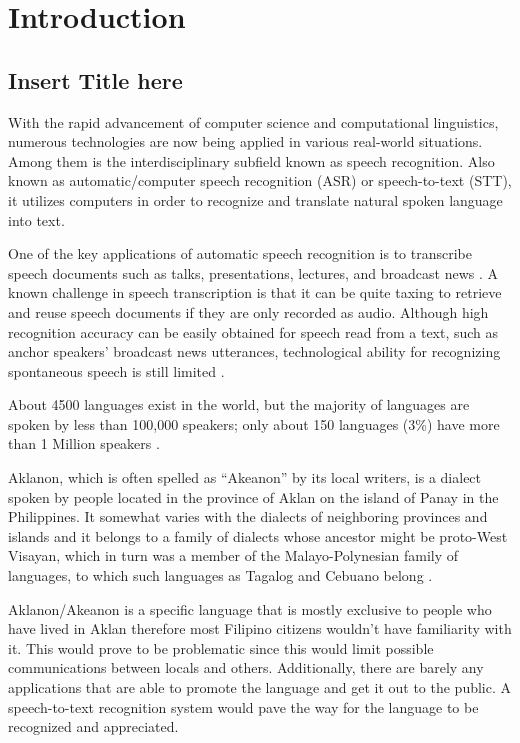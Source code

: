 \chapter{Introduction}

\section{Insert Title here}

With the rapid advancement of computer science and computational linguistics, numerous technologies are now being applied in various real-world situations. Among them is the interdisciplinary subfield known as speech recognition. Also known as automatic/computer speech recognition (ASR) or speech-to-text (STT), it utilizes computers in order to recognize and translate natural spoken language into text.

One of the key applications of automatic speech recognition is to transcribe speech documents such as talks, presentations, lectures, and broadcast news \cite{furui2004speech}. A known challenge in speech transcription is that it can be quite taxing to retrieve and reuse speech documents if they are only recorded as audio. Although high recognition accuracy can be easily obtained for speech read from a text, such as anchor speakers’ broadcast news utterances, technological ability for recognizing spontaneous speech is still limited \cite{furui2004speech}.

About 4500 languages exist in the world, but the majority of languages are spoken by less than 100,000 speakers; only about 150 languages (3\%) have more than 1 Million speakers \cite{schultz2002globalphone}.

Aklanon, which is often spelled as “Akeanon” by its local writers, is a dialect spoken by people located in the province of Aklan on the island of Panay in the Philippines. It somewhat varies with the dialects of neighboring provinces and islands and it belongs to a family of dialects whose ancestor might be proto-West Visayan, which in turn was a member of the Malayo-Polynesian family of languages, to which such languages as Tagalog and Cebuano belong \cite{de1968study}.

Aklanon/Akeanon is a specific language that is mostly exclusive to people who have lived in Aklan therefore most Filipino citizens wouldn’t have familiarity with it. This would prove to be problematic since this would limit possible communications between locals and others. Additionally, there are barely any applications that are able to promote the language and get it out to the public. A speech-to-text recognition system would pave the way for the language to be recognized and appreciated.

